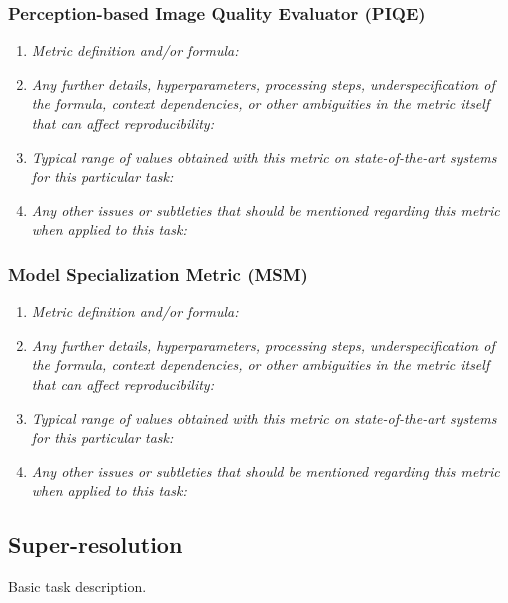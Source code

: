 \documentclass[a4paper,11pt]{article}
\begin{document}
        \subsubsection{Perception-based Image Quality Evaluator (PIQE)}
            \begin{enumerate}[label=\alph*.]
                \item \textit{Metric definition and/or formula:}
                \bigskip
                \item \textit{Any further details, hyperparameters, processing steps, underspecification of the formula, context dependencies, or other ambiguities in the metric itself that can affect reproducibility:}
                \bigskip
                \item \textit{Typical range of values obtained with this metric on state-of-the-art systems for this particular task:}
                \bigskip
                \item \textit{Any other issues or subtleties that should be mentioned regarding this metric when applied to this task:}
                \bigskip
            \end{enumerate}
        \subsubsection{Model Specialization Metric (MSM)}
            \begin{enumerate}[label=\alph*.]
                \item \textit{Metric definition and/or formula:}
                \bigskip
                \item \textit{Any further details, hyperparameters, processing steps, underspecification of the formula, context dependencies, or other ambiguities in the metric itself that can affect reproducibility:}
                \bigskip
                \item \textit{Typical range of values obtained with this metric on state-of-the-art systems for this particular task:}
                \bigskip
                \item \textit{Any other issues or subtleties that should be mentioned regarding this metric when applied to this task:}
                \bigskip
            \end{enumerate}
    

    \subsection{Super-resolution} \label{super_resolution}
        Basic task description.
\end{document}

